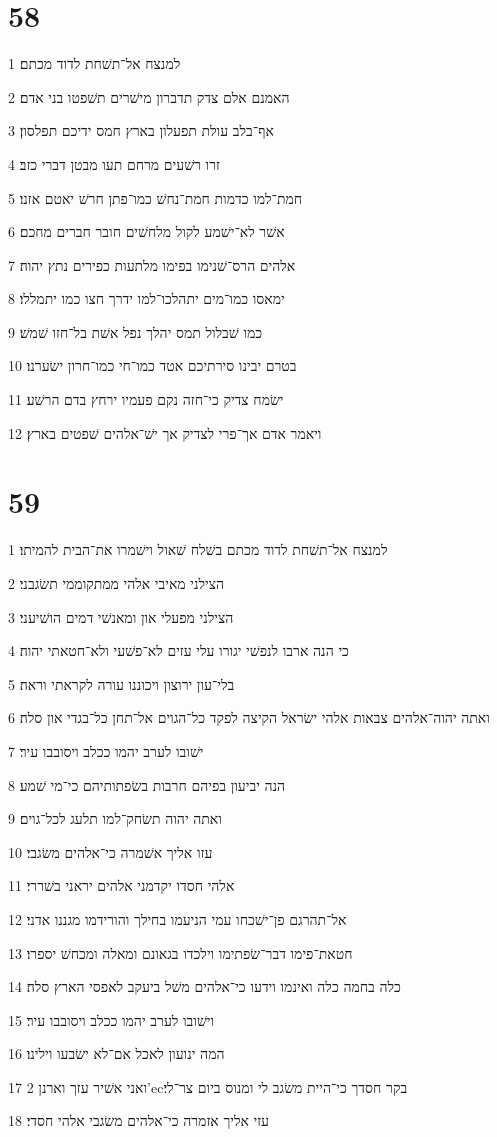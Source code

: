 \chapter{58}

\par 1 למנצח אל־תשׁחת לדוד מכתם׃
\par 2 האמנם אלם צדק תדברון מישׁרים תשׁפטו בני אדם׃
\par 3 אף־בלב עולת תפעלון בארץ חמס ידיכם תפלסון׃
\par 4 זרו רשׁעים מרחם תעו מבטן דברי כזב׃
\par 5 חמת־למו כדמות חמת־נחשׁ כמו־פתן חרשׁ יאטם אזנו׃
\par 6 אשׁר לא־ישׁמע לקול מלחשׁים חובר חברים מחכם׃
\par 7 אלהים הרס־שׁנימו בפימו מלתעות כפירים נתץ יהוה׃
\par 8 ימאסו כמו־מים יתהלכו־למו ידרך חצו כמו יתמללו׃
\par 9 כמו שׁבלול תמס יהלך נפל אשׁת בל־חזו שׁמשׁ׃
\par 10 בטרם יבינו סירתיכם אטד כמו־חי כמו־חרון ישׂערנו׃
\par 11 ישׂמח צדיק כי־חזה נקם פעמיו ירחץ בדם הרשׁע׃
\par 12 ויאמר אדם אך־פרי לצדיק אך ישׁ־אלהים שׁפטים בארץ׃

\chapter{59}

\par 1 למנצח אל־תשׁחת לדוד מכתם בשׁלח שׁאול וישׁמרו את־הבית להמיתו׃
\par 2 הצילני מאיבי אלהי ממתקוממי תשׂגבני׃
\par 3 הצילני מפעלי און ומאנשׁי דמים הושׁיעני׃
\par 4 כי הנה ארבו לנפשׁי יגורו עלי עזים לא־פשׁעי ולא־חטאתי יהוה׃
\par 5 בלי־עון ירוצון ויכוננו עורה לקראתי וראה׃
\par 6 ואתה יהוה־אלהים צבאות אלהי ישׂראל הקיצה לפקד כל־הגוים אל־תחן כל־בגדי און סלה׃
\par 7 ישׁובו לערב יהמו ככלב ויסובבו עיר׃
\par 8 הנה יביעון בפיהם חרבות בשׂפתותיהם כי־מי שׁמע׃
\par 9 ואתה יהוה תשׂחק־למו תלעג לכל־גוים׃
\par 10 עזו אליך אשׁמרה כי־אלהים משׂגבי׃
\par 11 אלהי חסדו יקדמני אלהים יראני בשׁררי׃
\par 12 אל־תהרגם פן־ישׁכחו עמי הניעמו בחילך והורידמו מגננו אדני׃
\par 13 חטאת־פימו דבר־שׂפתימו וילכדו בגאונם ומאלה ומכחשׁ יספרו׃
\par 14 כלה בחמה כלה ואינמו וידעו כי־אלהים משׁל ביעקב לאפסי הארץ סלה׃
\par 15 וישׁובו לערב יהמו ככלב ויסובבו עיר׃
\par 16 המה ינועון לאכל אם־לא ישׂבעו וילינו׃
\par 17 ואני אשׁיר עזך וארנן 2'ecבקר חסדך כי־היית משׂגב לי ומנוס ביום צר־לי׃
\par 18 עזי אליך אזמרה כי־אלהים משׂגבי אלהי חסדי׃

